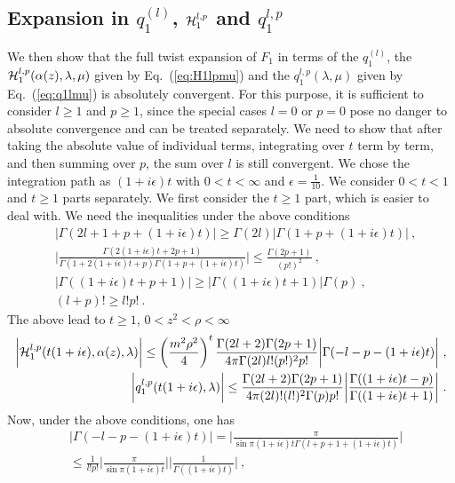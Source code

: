 \documentclass[a4paper,11pt]{article}
\begin{document}
\subsection{Expansion in $q_1^{(l)}$, ${\cal H}_1^{l,p}$ and $q_1^{l,p}$}
We then show that the full twist expansion of $F_1$ in terms of the $q^{(l)}_1$, the ${\cal H}_1^{l,p}(\alpha(z),\lambda,\mu)$ given by Eq.~(\ref{eq:H1lpmu}) and the $q_1^{l,p}(\lambda,\mu)$ given by Eq.~(\ref{eq:q1lmu}) is absolutely convergent. For this purpose, it is sufficient to consider $l\ge 1$ and $p\ge 1$, since the special cases $l=0$ or $p=0$ pose no danger to absolute convergence and can be treated separately. We need to show that after taking the absolute value of individual terms, integrating over $t$ term by term, and then summing over $p$, the sum over $l$ is still convergent. We chose the integration path as $(1+i\epsilon)t$ with $0<t<\infty$ and $\epsilon=\frac{1}{10}$. We consider $0<t<1$ and $t \ge 1$ parts separately. We first consider the $t\ge 1$ part, which is easier to deal with. We need the inequalities under the above conditions
\begin{align}
&\bigg|\Gamma(2l+1+p+(1+i\epsilon)t)\bigg|\ge \Gamma(2l)\bigg|\Gamma(1+p+(1+i\epsilon)t)\bigg| \ , \\
&\bigg|\frac{\Gamma(2(1+i\epsilon)t+2p+1)}{\Gamma(1+2(1+i\epsilon)t+p)\Gamma(1+p+(1+i\epsilon)t)}\bigg| \le \frac{\Gamma(2p+1)}{(p!)^2} \  , \\
&\bigg|\Gamma((1+i\epsilon)t+p+1)\bigg| \ge \bigg|\Gamma((1+i\epsilon)t+1)\bigg|\Gamma(p) \ , \\ 
&(l+p)!\ge l!p! \ .
\end{align}
The above lead to $t\ge 1$, $0<z^2<\rho<\infty$
\begin{align}
\bigg|{\cal H}_1^{l,p}(t(1+i\epsilon ),\alpha(z),\lambda)\bigg| \le \left(\frac{m^2\rho^2}{4}\right)^t\frac{\Gamma(2l+2)\Gamma(2p+1)}{4\pi\Gamma(2l)l! (p!)^2 p! }\bigg|\Gamma(-l-p-(1+i\epsilon)t)\bigg| \ , \\
\bigg|q_1^{l,p}(t(1+i\epsilon ),\lambda)\bigg| \le \frac{\Gamma(2l+2)\Gamma(2p+1)}{4\pi (2l)! (l!)^2 \Gamma(p) p!}\bigg|\frac{\Gamma((1+i\epsilon)t-p)}{\Gamma((1+i\epsilon)t+1)}\bigg| \ .
\end{align}
Now, under the above conditions, one has
\begin{align}
&\bigg|\Gamma(-l-p-(1+i\epsilon)t)\bigg|=\bigg|\frac{\pi}{\sin \pi(1+i\epsilon)t \Gamma(l+p+1+(1+i\epsilon)t)}\bigg|\nonumber \\ 
&\le \frac{1}{l!p!}\bigg|\frac{\pi}{\sin \pi(1+i\epsilon)t}\bigg| \bigg|\frac{1}{\Gamma((1+i\epsilon)t)}\bigg| \ ,
\end{align}
\end{document}
